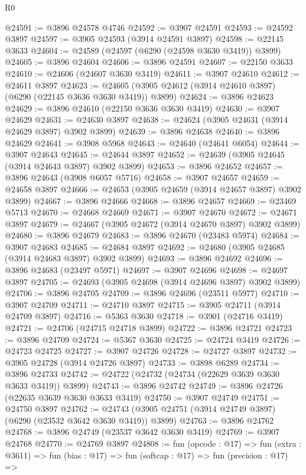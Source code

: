 \begin{lexlean}{R0}
\begin{coremodule}
@24591 := @3896 @24578 @4746
@24592 := @3907 @24591
@24593 := @24592 @3897
@24597 := @3905 @24593 (@3914 @24591 @3897)
@24598 := @22145 @3633
@24604 := @24589 (@24597 (@6290 (@24598 @3630 @3419)) @3899)
@24605 := @3896 @24604
@24606 := @3896 @24591
@24607 := @22150 @3633
@24610 := @24606 (@24607 @3630 @3419)
@24611 := @3907 @24610
@24612 := @24611 @3897
@24623 := @24605 (@3905 @24612 (@3914 @24610 @3897) (@6290 (@22145 @3636 @3630 @3419)) @3899)
@24624 := @3896 @24623
@24629 := @3896 @24610 (@22150 @3636 @3630 @3419)
@24630 := @3907 @24629
@24631 := @24630 @3897
@24638 := @24624 (@3905 @24631 (@3914 @24629 @3897) @3902 @3899)
@24639 := @3896 @24638
@24640 := @3896 @24629
@24641 := @3908 @5968
@24643 := @24640 (@24641 @6054)
@24644 := @3907 @24643
@24645 := @24644 @3897
@24652 := @24639 (@3905 @24645 (@3914 @24643 @3897) @3902 @3899)
@24653 := @3896 @24652
@24657 := @3896 @24643 (@3908 @6057 @5716)
@24658 := @3907 @24657
@24659 := @24658 @3897
@24666 := @24653 (@3905 @24659 (@3914 @24657 @3897) @3902 @3899)
@24667 := @3896 @24666
@24668 := @3896 @24657
@24669 := @23469 @5713
@24670 := @24668 @24669
@24671 := @3907 @24670
@24672 := @24671 @3897
@24679 := @24667 (@3905 @24672 (@3914 @24670 @3897) @3902 @3899)
@24680 := @3896 @24679
@24683 := @3896 @24670 (@23483 @5974)
@24684 := @3907 @24683
@24685 := @24684 @3897
@24692 := @24680 (@3905 @24685 (@3914 @24683 @3897) @3902 @3899)
@24693 := @3896 @24692
@24696 := @3896 @24683 (@23497 @5971)
@24697 := @3907 @24696
@24698 := @24697 @3897
@24705 := @24693 (@3905 @24698 (@3914 @24696 @3897) @3902 @3899)
@24706 := @3896 @24705
@24709 := @3896 @24696 (@23511 @5977)
@24710 := @3907 @24709
@24711 := @24710 @3897
@24715 := @3905 @24711 (@3914 @24709 @3897)
@24716 := @5363 @3630
@24718 := @3901 (@24716 @3419)
@24721 := @24706 (@24715 @24718 @3899)
@24722 := @3896 @24721
@24723 := @3896 @24709
@24724 := @5367 @3630
@24725 := @24724 @3419
@24726 := @24723 @24725
@24727 := @3907 @24726
@24728 := @24727 @3897
@24732 := @3905 @24728 (@3914 @24726 @3897)
@24733 := @3898 @6289
@24734 := @3896 @24733
@24742 := @24722 (@24732 (@24734 (@22629 @3639 @3630 @3633 @3419)) @3899)
@24743 := @3896 @24742
@24749 := @3896 @24726 (@22635 @3639 @3630 @3633 @3419)
@24750 := @3907 @24749
@24751 := @24750 @3897
@24762 := @24743 (@3905 @24751 (@3914 @24749 @3897) (@6290 (@23532 @3642 @3630 @3419)) @3899)
@24763 := @3896 @24762
@24768 := @3896 @24749 (@23537 @3642 @3630 @3419)
@24769 := @3907 @24768
@24770 := @24769 @3897
@24808 := fun (opcode : @17) =>
  fun (extra : @3611) =>
  fun (bias : @17) =>
  fun (softcap : @17) =>
  fun (precision : @17) =>

\end{coremodule}
\end{lexlean}
